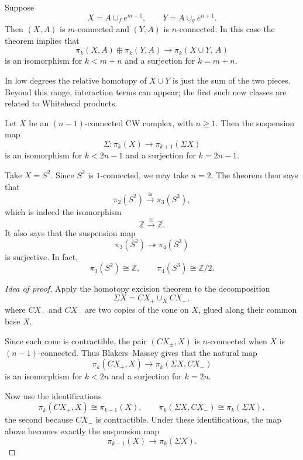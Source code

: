 \documentclass[12pt]{article}
\begin{document}
\begin{example}
Suppose
\[
X=A\cup_f e^{m+1},
\qquad
Y=A\cup_g e^{n+1}.
\]
Then $(X,A)$ is $m$-connected and $(Y,A)$ is $n$-connected. In this case the theorem implies that
\[
\pi_k(X,A)\oplus \pi_k(Y,A)\longrightarrow \pi_k(X\cup Y,\,A)
\]
is an isomorphism for $k<m+n$ and a surjection for $k=m+n$.
\end{example}


In low degrees the relative homotopy of $X\cup Y$ is just the sum of the
two pieces. Beyond this range, interaction terms can appear; the first such
new classes are related to Whitehead products.
\begin{theorem}
Let $X$ be an $(n-1)$-connected CW complex, with $n\ge 1$. Then the suspension map
\[
\Sigma \colon \pi_k(X)\longrightarrow \pi_{k+1}(\Sigma X)
\]
is an isomorphism for $k<2n-1$ and a surjection for $k=2n-1$.
\end{theorem}

\begin{example}
Take $X=S^2$. Since $S^2$ is $1$-connected, we may take $n=2$. The theorem then says that
\[
\pi_2(S^2)\xrightarrow{\;\cong\;} \pi_3(S^3),
\]
which is indeed the isomorphism
\[
\mathbb Z \xrightarrow{\;\cong\;} \mathbb Z.
\]
It also says that the suspension map
\[
\pi_3(S^2)\twoheadrightarrow \pi_4(S^3)
\]
is surjective. In fact,
\[
\pi_3(S^2)\cong \mathbb Z,
\qquad
\pi_4(S^3)\cong \mathbb Z/2.
\]
\end{example}

\begin{proof}[Idea of proof]
Apply the homotopy excision theorem to the decomposition
\[
\Sigma X = CX_+ \cup_X CX_-,
\]
where $CX_+$ and $CX_-$ are two copies of the cone on $X$, glued along their common base $X$.

Since each cone is contractible, the pair $(CX_\pm,X)$ is $n$-connected when $X$ is $(n-1)$-connected. Thus Blakers--Massey gives that the natural map
\[
\pi_k(CX_+,X)\longrightarrow \pi_k(\Sigma X,CX_-)
\]
is an isomorphism for $k<2n$ and a surjection for $k=2n$.

Now use the identifications
\[
\pi_k(CX_+,X)\cong \pi_{k-1}(X),
\qquad
\pi_k(\Sigma X,CX_-)\cong \pi_k(\Sigma X),
\]
the second because $CX_-$ is contractible. Under these identifications, the map above becomes exactly the suspension map
\[
\pi_{k-1}(X)\longrightarrow \pi_k(\Sigma X).
\]
\end{proof}
\end{document}
